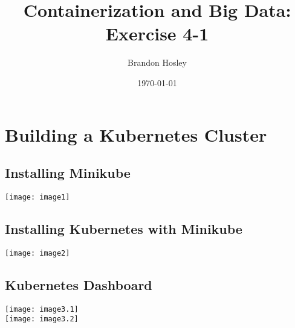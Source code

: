 \documentclass[]{article}
\title{Containerization and Big Data: Exercise 4-1}
\author{Brandon Hosley}
\date{\today}
\begin{document}
\maketitle
	
\setcounter{section}{3}
\section{Building a Kubernetes Cluster}
	
\subsection{Installing Minikube}
	\texttt{[image: image1]}
	
\subsection{Installing Kubernetes with Minikube}
	\texttt{[image: image2]}
	
\subsection{Kubernetes Dashboard}
	\texttt{[image: image3.1]} \\
	\texttt{[image: image3.2]}
	
\end{document}
